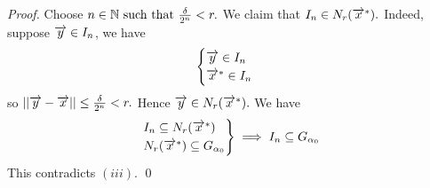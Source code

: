 \documentclass[a4paper]{article}
\begin{document}
\begin{proof}
		Choose $n\in \mathbb{N} \text{ such that } \frac{\delta}{2^n} < r.$ We claim that $I_n \in N_{r}(\overrightarrow{x}^*).$ Indeed,
		suppose $\overrightarrow{y}\in I_n$, we have $$\begin{cases}
			\overrightarrow{y}\in I_n \\
			\overrightarrow{x}^* \in I_n
		\end{cases}$$
		so $||\overrightarrow{y} - \overrightarrow{x}|| \leq \frac{\delta}{2^n} < r.$ Hence $\overrightarrow{y} \in N_{r}(\overrightarrow{x}^*).$ We have
		$$\begin{rcases}
			I_n \subseteq N_{r}(\overrightarrow{x}^*) \\
			N_{r}(\overrightarrow{x}^*) \subseteq G_{\alpha_0}
		\end{rcases}
		\implies I_n \subseteq G_{\alpha_0}$$
		This contradicts $(iii)$. \qed
	\end{proof}
\end{document}
